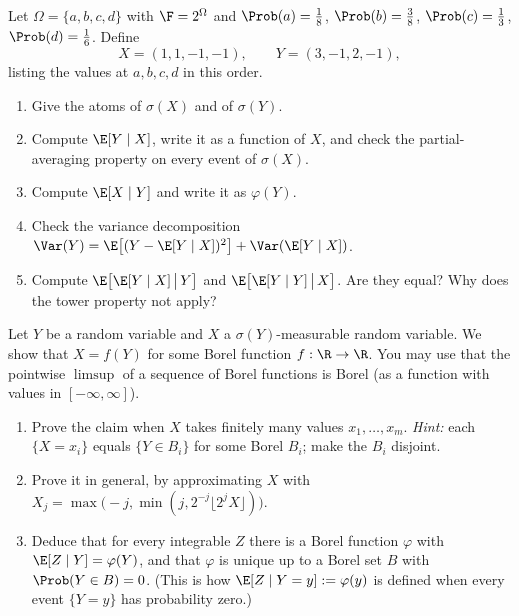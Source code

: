 \begin{exercise}\label{ex:pr-four-points}
\easy Let $\Omega=\{a,b,c,d\}$ with $\F=2^\Omega$ and
$\Prob(a)=\frac18$, $\Prob(b)=\frac38$, $\Prob(c)=\frac13$, $\Prob(d)=\frac16$. Define
\[
  X=(1,1,-1,-1),\qquad Y=(3,-1,2,-1),
\]
listing the values at $a,b,c,d$ in this order.
\begin{enumerate}[label=(\alph*)]
  \item Give the atoms of $\sigma(X)$ and of $\sigma(Y)$.
  \item Compute $\E[Y\mid X]$, write it as a function of $X$, and check the partial-averaging
    property on every event of $\sigma(X)$.
  \item Compute $\E[X\mid Y]$ and write it as $\varphi(Y)$.
  \item Check the variance decomposition $\Var(Y)=\E\big[(Y-\E[Y\mid X])^2\big]+\Var(\E[Y\mid X])$.
  \item Compute $\E\big[\E[Y\mid X]\,\big|\,Y\big]$ and $\E\big[\E[Y\mid Y]\,\big|\,X\big]$. Are
    they equal? Why does the tower property not apply?
\end{enumerate}
\end{exercise}

\begin{exercise}\label{ex:pr-doob-dynkin}
\medium Let $Y$ be a random variable and $X$ a $\sigma(Y)$-measurable random variable. We show
that $X=f(Y)$ for some Borel function $f:\R\to\R$. You may use that the pointwise
$\limsup$ of a sequence of Borel functions is Borel (as a function with values in
$[-\infty,\infty]$).
\begin{enumerate}[label=(\alph*)]
  \item Prove the claim when $X$ takes finitely many values $x_1,\dots,x_m$. \emph{Hint:} each
    $\{X=x_i\}$ equals $\{Y\in B_i\}$ for some Borel $B_i$; make the $B_i$ disjoint.
  \item Prove it in general, by approximating $X$ with
    $X_j=\max\big(-j,\min(j,2^{-j}\lfloor2^jX\rfloor)\big)$.
  \item Deduce that for every integrable $Z$ there is a Borel function $\varphi$ with
    $\E[Z\mid Y]=\varphi(Y)$, and that $\varphi$ is unique up to a Borel set $B$ with
    $\Prob(Y\in B)=0$. (This is how $\E[Z\mid Y=y]:=\varphi(y)$ is defined when every event
    $\{Y=y\}$ has probability zero.)
\end{enumerate}
\end{exercise}

